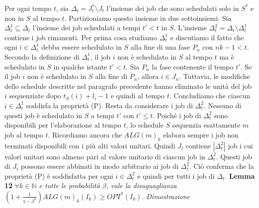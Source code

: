\documentclass[12pt]{article}
\newcommand*{\N}{\mathbb{N}}
\begin{document}
Per ogni tempo $t$, sia $\Delta_{t} = J_{t}^{*} \setminus J_{t}$ l'insieme dei job che sono schedulati solo in $S^{*}$ e non in $S$ al tempo $t$. Partizioniamo questo insieme in due sottoinsiemi. Sia $\Delta^{1}_{t} \subseteq \Delta_{t}$ l'insieme dei job schedulati a tempi $t' < t$ in $S$. L'insieme $\Delta^{2}_{t} = \Delta_{t} \setminus \Delta^{1}_{t}$ contiene i job rimanenti. Per prima cosa studiamo $\Delta^{1}_{t}$ e discutiamo il fatto che ogni $i \in \Delta^{1}_{t}$ debba essere schedulato in $S$ alla fine di una fase $P_{n}$ con $nk - 1 <t$. Secondo la definizione di $\Delta^{1}_{t}$, il job $i$ non è schedulato in $S$ al tempo $t$ ma è schedulato in $S$ in qualche istante $t' <t$. Sia $P_{n}$ la fase contenente il tempo $t'$. Se il job $i$ non è schedulato in $S$ alla fine di $P_{n}$, allora $i \in J_{n}$. Tuttavia, le modifiche dello schedule descritte nel paragrafo precedente hanno eliminato le unità del job $i$ sequenziate dopo $t_{S}(i) + l_{i} - 1$ e quindi al tempo $t$. Concludiamo che ciascun $i \in \Delta^{1}_{t}$ soddisfa la proprietà (P). Resta da considerare i job di $\Delta^{2}_{t}$. Nessuno di questi job è schedulato in $S$ a tempi $t'$ con $t' \leq t$. Poiché i job di $\Delta^{2}_{t}$ sono disponibili per l'elaborazione al tempo $t$, lo schedule $S$ sequenzia esattamente $m$ job al tempo $t$. Ricordiamo ancora che $ALG(m)_{k}$ elabora sempre i job non terminati disponibili con i più alti valori unitari. Quindi $J_{t}$ contiene $|\Delta^{2}_{t}|$ job i cui valori unitari sono almeno pari al valore unitario di ciascun job in $\Delta^{2}_{t}$. Questi job di $J_{t}$ possono essere abbinati in modo arbitrario ai job di $\Delta^{2}_{t}$. Ciò conferma che la proprietà (P) è soddisfatta per ogni $i \in \Delta^{2}_{t}$ e quindi per tutti i job di $\Delta_{t}$.
\newline \newline
\textbf{Lemma 12} 
\textit{$\forall k \in \N$ e tutte le probabilità $\beta$, vale la disuguaglianza $(1 + \frac{1}{1 - \beta^{k}}) ALG(m)_{k}(I_{k}) \geq OPT^{*}(I_{k})$.}
\newline \newline
\textit{Dimostrazione} 
\end{document}
